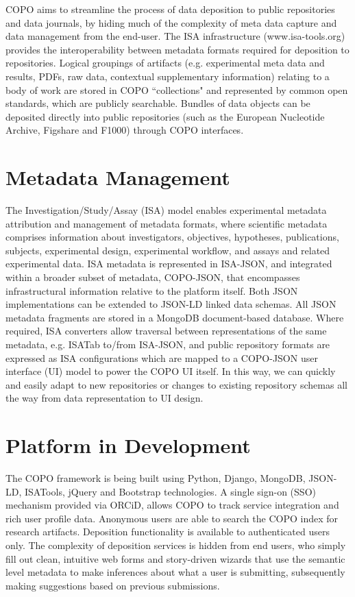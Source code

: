 \documentclass[runningheads,a4paper]{llncs}
\begin{document}
COPO aims to streamline the process of data deposition to public
repositories and data journals, by hiding much of the complexity of meta data capture and data management from the end-user. The ISA infrastructure (www.isa-tools.org) provides the interoperability between metadata formats required for deposition to repositories. Logical groupings of artifacts (e.g. experimental meta data and results, PDFs, raw data, contextual supplementary information)
relating to a body of work are stored in COPO “collections" and represented by common open standards, which are publicly searchable. Bundles of data objects can be
deposited directly into public repositories (such as the European Nucleotide Archive, Figshare and F1000) through COPO interfaces.



\vspace*{-0.3in}
\section{Metadata Management}

The Investigation/Study/Assay (ISA) model enables experimental
metadata attribution and management of metadata formats, where
scientific metadata comprises information about investigators,
objectives, hypotheses, publications, subjects, experimental design,
experimental workflow, and assays and related experimental data. ISA
metadata is represented in ISA-JSON, and integrated within a broader
subset of metadata, COPO-JSON, that encompasses infrastructural
information relative to the platform itself. Both JSON implementations
can be extended to JSON-LD linked data schemas. All JSON metadata
fragments are stored in a MongoDB document-based database.
Where required, ISA converters allow traversal between representations
of the same metadata, e.g. ISATab to/from ISA-JSON, and public
repository formats are expressed as ISA configurations which are
mapped to a COPO-JSON user interface (UI) model to power the COPO UI
itself. In this way, we can quickly and easily adapt to new
repositories or changes to existing repository schemas all the way
from data representation to UI design.

\vspace*{-0.1in}
\section{Platform in Development}


The COPO framework is being built using Python, Django, MongoDB,
JSON-LD, ISATools, jQuery and Bootstrap technologies. A single sign-on (SSO) mechanism provided via ORCiD, allows COPO to track
service integration and rich user profile data. Anonymous users are
able to search the COPO index for research artifacts. Deposition functionality is available to authenticated users only. The complexity of deposition services is hidden from end users, who simply fill out clean, intuitive web forms and story-driven wizards that use the semantic level metadata to make inferences about what a user is submitting, subsequently making suggestions based on previous
submissions.
\end{document}
